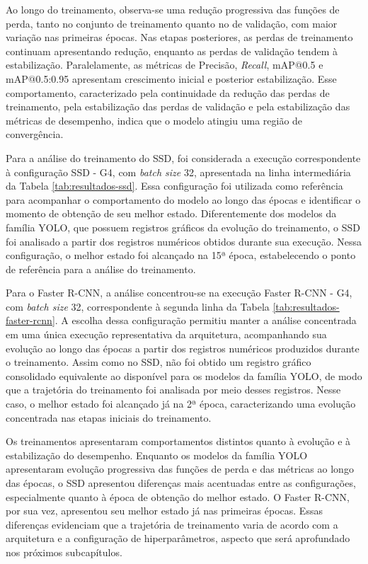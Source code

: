 \vspace{1em}
Ao longo do treinamento, observa-se uma redução progressiva das funções de perda, tanto no conjunto
de treinamento quanto no de validação, com maior variação nas primeiras épocas. Nas etapas posteriores,
as perdas de treinamento continuam apresentando redução, enquanto as perdas de validação tendem à
estabilização. Paralelamente, as métricas de Precisão, \textit{Recall}, mAP@0.5 e mAP@0.5:0.95
apresentam crescimento inicial e posterior estabilização. Esse comportamento, caracterizado pela
continuidade da redução das perdas de treinamento, pela estabilização das perdas de validação e pela
estabilização das métricas de desempenho, indica que o modelo atingiu uma região de convergência.

Para a análise do treinamento do SSD, foi considerada a execução correspondente à configuração
SSD - G4, com \textit{batch size} 32, apresentada na linha intermediária da Tabela
\ref{tab:resultados-ssd}. Essa configuração foi utilizada como referência para acompanhar o
comportamento do modelo ao longo das épocas e identificar o momento de obtenção de seu melhor
estado. Diferentemente dos modelos da família YOLO, que possuem registros gráficos da evolução do
treinamento, o SSD foi analisado a partir dos registros numéricos obtidos durante sua execução.
Nessa configuração, o melhor estado foi alcançado na 15ª época, estabelecendo o ponto de referência
para a análise do treinamento.

Para o Faster R-CNN, a análise concentrou-se na execução Faster R-CNN - G4, com \textit{batch size}
32, correspondente à segunda linha da Tabela \ref{tab:resultados-faster-rcnn}. A escolha dessa
configuração permitiu manter a análise concentrada em uma única execução representativa da
arquitetura, acompanhando sua evolução ao longo das épocas a partir dos registros numéricos
produzidos durante o treinamento. Assim como no SSD, não foi obtido um registro gráfico consolidado
equivalente ao disponível para os modelos da família YOLO, de modo que a trajetória do treinamento
foi analisada por meio desses registros. Nesse caso, o melhor estado foi alcançado já na 2ª época,
caracterizando uma evolução concentrada nas etapas iniciais do treinamento.

Os treinamentos apresentaram comportamentos distintos quanto à evolução e à estabilização do
desempenho. Enquanto os modelos da família YOLO apresentaram evolução progressiva das funções
de perda e das métricas ao longo das épocas, o SSD apresentou diferenças mais acentuadas entre as 
configurações, especialmente quanto à época de obtenção do melhor estado. O Faster R-CNN, por sua 
vez, apresentou seu melhor estado já nas primeiras épocas. Essas diferenças evidenciam que a 
trajetória de treinamento varia de acordo com a arquitetura e a configuração de hiperparâmetros, 
aspecto que será aprofundado nos próximos subcapítulos.

